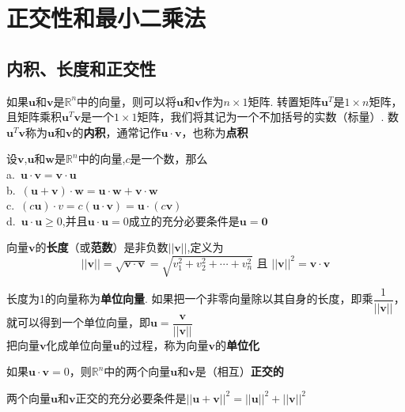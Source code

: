 \chapter{正交性和最小二乘法}
\section{内积、长度和正交性}
如果$\bm{u}$和$\bm{v}$是$\mathbb{R}^n$中的向量，则可以将$\bm{u}$和$\bm{v}$作为$n\times 1$矩阵. 转置矩阵$\bm{u}^T$是$1\times n$矩阵，且矩阵乘积$\bm{u}^T\bm{v}$是一个$1\times 1$矩阵，我们将其记为一个不加括号的实数（标量）. 数$\bm{u}^T\bm{v}$称为$\bm{u}$和$\bm{v}$的\textbf{内积}，通常记作$\bm{u}\cdot\bm{v}$，也称为\textbf{点积}\\[2ex]

\begin{TheoremOne}
设$\bm{v}$,$\bm{u}$和$\bm{w}$是$\mathbb{R}^n$中的向量,$c$是一个数，那么\\
a.\ $\bm{u\cdot v=v\cdot u}$\\
b.\ $\bm{(u+v)\cdot w=u\cdot w+v\cdot w}$\\
c.\ $(c\bm{u})\cdot v=c(\bm{u\cdot v})=\bm{u}\cdot(c\bm{v})$\\
d.\ $\bm{u\cdot u}\geqslant 0$,并且$\bm{u\cdot u}=0$成立的充分必要条件是$\bm{u=0}$
\end{TheoremOne}\vspace{4ex}

\begin{definition}
向量$\bm{v}$的\textbf{长度}（或\textbf{范数}）是非负数$||\bm{v}||$,定义为
\[||\bm{v}||=\sqrt{\bm{v}\cdot \bm{v}}=\sqrt{v_1^2+v_2^2+\cdots+v_n^2}\text{\ 且\ }||\bm{v}||^2=\bm{v}\cdot \bm{v}\]
\end{definition}\vspace{4ex}

长度为1的向量称为\textbf{单位向量}. 如果把一个非零向量除以其自身的长度，即乘$\dfrac{1}{||\bm{v}||}$，就可以得到一个单位向量，即$\bm{u}=\dfrac{\bm{v}}{||\bm{v}||}$\\[1ex]

把向量$\bm{v}$化成单位向量$\bm{u}$的过程，称为向量$\bm{v}$的\textbf{单位化}\\[2ex]

\begin{definition}
如果$\bm{u\cdot v}=0$，则$\mathbb{R}^n$中的两个向量$\bm{u}$和$\bm{v}$是（相互）\textbf{正交的}
\end{definition}\vspace{4ex}

\begin{TheoremTwo}[毕达哥拉斯（勾股）定理]
两个向量$\bm{u}$和$\bm{v}$正交的充分必要条件是$||\bm{u+v}||^2=||\bm{u}||^2+||\bm{v}||^2$
\end{TheoremTwo}\vspace{4ex}

